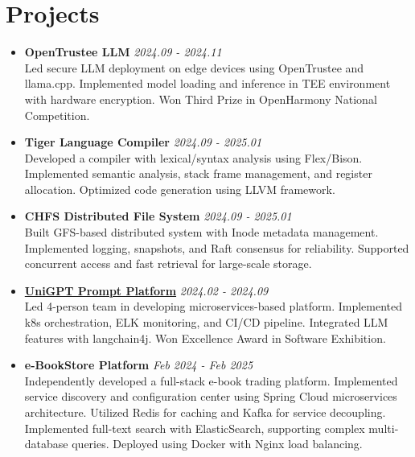 \documentclass[a4paper]{article}
\begin{document}
\section*{Projects}
\begin{itemize}[leftmargin=*,label={},itemsep=0.3em,topsep=0.1em]
\item \textbf{OpenTrustee LLM} \hfill \textit{2024.09 - 2024.11}\\
Led secure LLM deployment on edge devices using OpenTrustee and llama.cpp. Implemented model loading and inference in TEE environment with hardware encryption. Won Third Prize in OpenHarmony National Competition.

\item \textbf{Tiger Language Compiler} \hfill \textit{2024.09 - 2025.01}\\
Developed a compiler with lexical/syntax analysis using Flex/Bison. Implemented semantic analysis, stack frame management, and register allocation. Optimized code generation using LLVM framework.

\item \textbf{CHFS Distributed File System} \hfill \textit{2024.09 - 2025.01}\\
Built GFS-based distributed system with Inode metadata management. Implemented logging, snapshots, and Raft consensus for reliability. Supported concurrent access and fast retrieval for large-scale storage.

\item \textbf{\href{https://base.sjtu.edu.cn/se/Awards.html}{UniGPT Prompt Platform}} \hfill \textit{2024.02 - 2024.09}\\
Led 4-person team in developing microservices-based platform. Implemented k8s orchestration, ELK monitoring, and CI/CD pipeline. Integrated LLM features with langchain4j. Won Excellence Award in Software Exhibition.

\item \textbf{e-BookStore Platform} \hfill \textit{Feb 2024 - Feb 2025}\\
Independently developed a full-stack e-book trading platform. Implemented service discovery and configuration center using Spring Cloud microservices architecture. Utilized Redis for caching and Kafka for service decoupling. Implemented full-text search with ElasticSearch, supporting complex multi-database queries. Deployed using Docker with Nginx load balancing.
\end{itemize}
\end{document}
